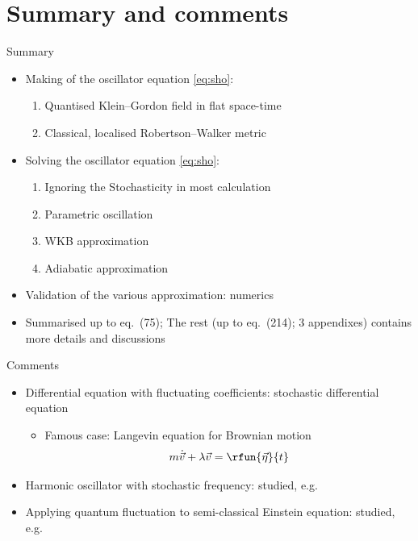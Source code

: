 \documentclass{beamer}
\begin{document}
\section{Summary and comments}

\begin{frame}{Summary}

\begin{itemize}
\item Making of the oscillator equation \cref{eq:sho}:
\begin{enumerate}
\item Quantised Klein--Gordon field in flat space-time
\item Classical, localised Robertson--Walker metric
\end{enumerate}
\item Solving  the oscillator equation \cref{eq:sho}:
\begin{enumerate}
\item Ignoring the Stochasticity in most calculation
\item Parametric oscillation
\item WKB approximation
\item Adiabatic approximation
\end{enumerate}
\item Validation of the various approximation: numerics

\item Summarised up to eq.~(75); The rest (up to eq.~(214); 3 appendixes) 
contains more details and discussions
\end{itemize}
  
\end{frame}

\begin{frame}{Comments}

\begin{itemize}
\item Differential equation with fluctuating coefficients: stochastic 
differential equation \cite{van-Kampen-2007}
\begin{itemize}
\item Famous case: Langevin equation for Brownian motion
\begin{equation}
m\dot {\vec v} + \lambda \vec v = \rfun{\vec \eta}{t}
\end{equation}

\end{itemize}
\item Harmonic oscillator with stochastic frequency: studied, e.g.\ 
\cite{Bourret_1973,Van_Kampen_1976}
\item Applying quantum fluctuation to semi-classical Einstein equation: 
studied, e.g.\ \cite{Hu_2008}

\end{itemize}
  
\end{frame}
\end{document}
